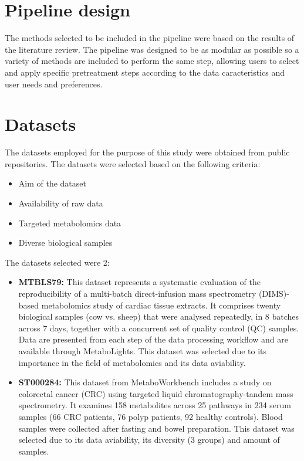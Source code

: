 \documentclass[ENG, BIB]{TFUOC}%
\begin{document}
\section{Pipeline design}
The methods selected to be included in the pipeline were based on the results of the literature review. The pipeline was designed to be as modular as possible so a variety of methods are included to perform the same step, allowing users to select and apply specific pretreatment steps according to the data caracteristics and user needs and preferences.

\section{Datasets}
The datasets employed for the purpose of this study were obtained from public repositories. The datasets were selected based on the following criteria:
\begin{itemize}
    \item Aim of the dataset
    \item Availability of raw data
    \item Targeted metabolomics data
    \item Diverse biological samples
\end{itemize}

The datasets selected were 2:
\begin{itemize}
    \item \textbf{MTBLS79:} \cite{kirwanDirectInfusionMass2014} This dataset represents a systematic evaluation of the reproducibility of a multi-batch direct-infusion mass spectrometry (DIMS)-based metabolomics study of cardiac tissue extracts. It comprises twenty biological samples (cow vs. sheep) that were analysed repeatedly, in 8 batches across 7 days, together with a concurrent set of quality control (QC) samples. Data are presented from each step of the data processing workflow and are available through MetaboLights. This dataset was selected due to its importance in the field of metabolomics and its data aviability.
    \item \textbf{ST000284:} \cite{zhuColorectalCancerDetection2014} This dataset from MetaboWorkbench includes a study on colorectal cancer (CRC) using targeted liquid chromatography-tandem mass spectrometry. It examines 158 metabolites across 25 pathways in 234 serum samples (66 CRC patients, 76 polyp patients, 92 healthy controls). Blood samples were collected after fasting and bowel preparation. This dataset was selected due to its data aviability, its diversity (3 groups) and amount of samples.

\end{itemize}
\end{document}
